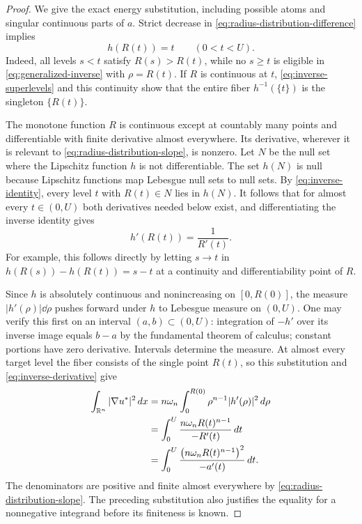 \begin{proof}
We give the exact energy substitution, including possible atoms and
singular continuous parts of $a$.  Strict decrease in
\eqref{eq:radius-distribution-difference} implies
\begin{equation}
 h(R(t))=t\qquad(0<t<U).
 \label{eq:inverse-identity}
\end{equation}
Indeed, all levels $s<t$ satisfy $R(s)>R(t)$, while no $s\ge t$ is
eligible in \eqref{eq:generalized-inverse} with $\rho=R(t)$.
If $R$ is continuous at $t$, \eqref{eq:inverse-superlevels} and this
continuity show that the entire fiber $h^{-1}(\{t\})$ is the singleton
$\{R(t)\}$.

The monotone function $R$ is continuous except at countably many
points and differentiable with finite derivative almost everywhere.
Its derivative, wherever it is relevant to
\eqref{eq:radius-distribution-slope}, is nonzero.
Let $N$ be the null set where the Lipschitz function $h$ is not
differentiable.  The set $h(N)$ is null because Lipschitz functions
map Lebesgue null sets to null sets.  By \eqref{eq:inverse-identity},
every level $t$ with $R(t)\in N$ lies in $h(N)$.  It follows that for
almost every $t\in(0,U)$ both derivatives needed below exist, and
differentiating the inverse identity gives
\begin{equation}
 h'(R(t))=\frac1{R'(t)}.
 \label{eq:inverse-derivative}
\end{equation}
For example, this follows directly by letting $s\to t$ in
$h(R(s))-h(R(t))=s-t$ at a continuity and differentiability point
of $R$.

Since $h$ is absolutely continuous and nonincreasing on $[0,R(0)]$,
the measure $|h'(\rho)|\dd\rho$ pushes forward under $h$ to Lebesgue
measure on $(0,U)$.  One may verify this first on an interval
$(a,b)\subset(0,U)$: integration of $-h'$ over its inverse image
equals $b-a$ by the fundamental theorem of calculus; constant
portions have zero derivative.  Intervals determine the measure.
At almost every target level the fiber consists of the single point
$R(t)$, so this substitution and \eqref{eq:inverse-derivative} give
\begin{align}
 \int_{\mathbb R^n}|\nabla u^*|^2\,d x
 &=n\omega_n\int_0^{R(0)}\rho^{n-1}|h'(\rho)|^2\,d\rho \notag\\
 &=\int_0^U\frac{n\omega_n R(t)^{n-1}}{-R'(t)}\,d t \notag\\
 &=\int_0^U
       \frac{\bigl(n\omega_n R(t)^{n-1}\bigr)^2}{-a'(t)}\,d t.
 \label{eq:rearranged-energy-identity}
\end{align}
The denominators are positive and finite almost everywhere by
\eqref{eq:radius-distribution-slope}.  The preceding substitution
also justifies the equality for a nonnegative integrand before its
finiteness is known.


\end{proof}

